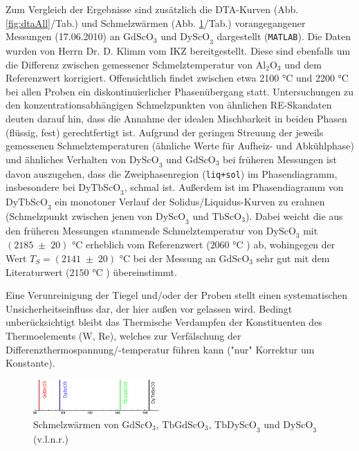 \documentclass[aps,twocolumn,secnumarabic,nobalancelastpage,amsmath,amssymb,
nofootinbib,superscriptaddress]{revtex4-1}
\begin{document}
\noindent Zum Vergleich der Ergebnisse sind zusätzlich die DTA-Kurven (Abb. \ref{fig:dtaAll}/Tab.) und Schmelzwärmen (Abb. \ref{fig:QAll}/Tab.) vorangegangener Messungen (17.06.2010) an $\text{GdScO}_3$ und $\text{DyScO}_3$ dargestellt (\texttt{MATLAB}).
Die Daten wurden von Herrn Dr. D. Klimm vom IKZ bereitgestellt. Diese sind ebenfalls um die Differenz zwischen gemessener Schmelztemperatur von $\text{Al}_{2}\text{O}_3$ und dem Referenzwert
korrigiert.
\noindent Offensichtlich findet zwischen etwa 2100 °C und 2200 °C bei allen Proben ein diskontinuierlicher Phasenübergang statt. Untersuchungen zu den
konzentrationsabhängigen Schmelzpunkten von ähnlichen RE-Skandaten deuten darauf hin, dass die Annahme der idealen Mischbarkeit in beiden Phasen (flüssig, fest) gerechtfertigt ist.
Aufgrund der geringen Streuung der jeweils gemessenen Schmelztemperaturen (ähnliche Werte für Aufheiz- und Abkühlphase) und ähnliches Verhalten von $\text{DyScO}_3$ und $\text{GdScO}_3$
bei früheren Messungen ist davon auszugehen, dass die Zweiphasenregion (\texttt{liq+sol}) im Phasendiagramm, insbesondere bei $\text{DyTbScO}_3$, schmal ist.
Außerdem ist im Phasendiagramm von $\text{DyTbScO}_3$ ein monotoner Verlauf der Solidus/Liquidus-Kurven zu erahnen (Schmelzpunkt zwischen jenen von $\text{DyScO}_3$ und $\text{TbScO}_3$).
Dabei weicht die aus den früheren Messungen stammende Schmelztemperatur von $\text{DyScO}_3$ mit $(2185\;\pm\;20)\text{ °C}$ erheblich vom Referenzwert ($2060\text{ °C}$ \cite{meltpDyScO3}) ab,
wohingegen der Wert $T_S=(2141\;\pm\; 20)\text{ °C}$ bei der Messung an $\text{GdScO}_3$ sehr gut mit dem Literaturwert ($2150\text{ °C}$ \cite{paperK}) übereinstimmt.

Eine Verunreinigung der Tiegel und/oder der Proben stellt einen systematischen Unsicherheitseinfluss dar, der hier außen vor gelassen wird. Bedingt unberücksichtigt bleibt das Thermische Verdampfen
der Konstituenten des Thermoelements (W, Re), welches zur Verfälschung der Differenzthermospannung/-temperatur führen kann ("nur"  Korrektur um Konstante).

\begin{figure}[t]
  \centering
  \includegraphics[width=0.43\textwidth]{../img/plotSchmelzwaermen.eps}
  \caption{\label{fig:QAll} Schmelzwärmen von $\text{GdScO}_3$, $\text{TbGdScO}_3$, $\text{TbDyScO}_3$ und $\text{DyScO}_3$ (v.l.n.r.) }
\end{figure}
\end{document}
